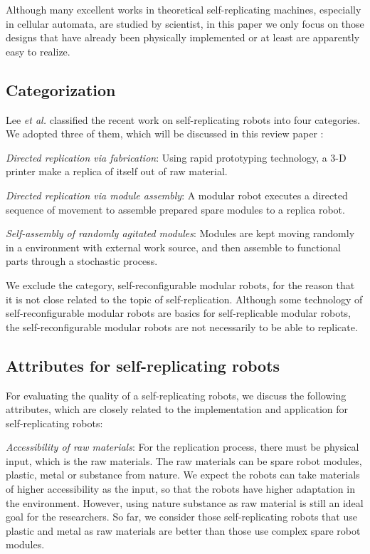 \documentclass[12pt,twoside]{article}
\theoremstyle{plain}
\theoremstyle{definition}
\theoremstyle{remark}
\newcommand{\etal}{\textit{et al.}}
\begin{document}
Although many excellent works in theoretical self-replicating machines, especially in cellular automata, are studied by scientist, in this paper we only focus on those designs that have already been physically implemented or at least are apparently easy to realize.

\subsection{Categorization}
Lee \etal\cite{lee_robotic_2008} classified the recent work on self-replicating robots into four categories. We adopted three of them, which will be discussed in this review paper :

  \emph{Directed replication via fabrication}: Using rapid prototyping technology, a 3-D printer make a replica of itself out of raw material.
  
  \emph{Directed replication via module assembly}: A modular robot executes a directed sequence of movement to assemble prepared spare modules to a replica robot.
  
  \emph{Self-assembly of randomly agitated modules}: Modules are kept moving randomly in a environment with external work source, and then assemble to functional parts through a stochastic process.

We exclude the category, self-reconfigurable modular robots, for the reason that it is not close related to the topic of self-replication. Although some technology of self-reconfigurable modular robots are basics for self-replicable modular robots, the self-reconfigurable modular robots are not necessarily to be able to replicate.

\subsection{Attributes for self-replicating robots}
For evaluating the quality of a self-replicating robots, we discuss the following attributes, which are closely related to the implementation and application for self-replicating robots:

\emph{Accessibility of raw materials}: For the replication process, there must be physical input, which is the raw materials. The raw materials can be spare robot modules, plastic, metal or substance from nature. We expect the robots can take materials of higher accessibility as the input, so that the robots have higher adaptation in the environment. However, using nature substance as raw material is still an ideal goal for the researchers. So far, we consider those self-replicating robots that use plastic and metal as raw materials are better than those use complex spare robot modules.
  
\end{document}

